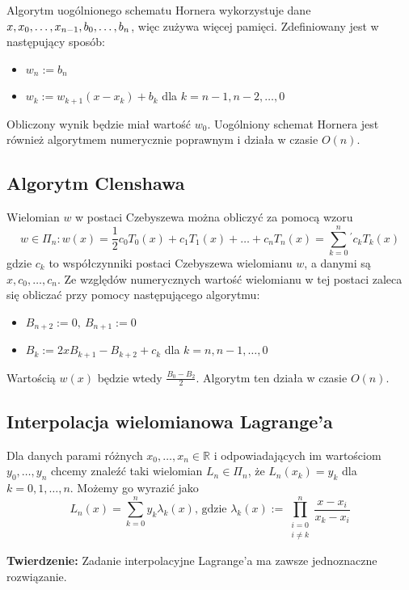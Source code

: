 \documentclass[a4paper,11pt]{article}
\begin{document}
\noindent Algorytm uogólnionego schematu Hornera wykorzystuje dane $x, x_0, \ldots, x_{n-1},\\ b_0, \ldots, b_n$, więc zużywa więcej pamięci. Zdefiniowany jest w następujący sposób:
\begin{itemize}
\item $w_n := b_n$
\item $w_k := w_{k+1}(x-x_k)+b_k$ dla $k=n-1, n-2, \ldots, 0$
\end{itemize}
Obliczony wynik będzie miał wartość $w_0$.
\newline Uogólniony schemat Hornera jest również algorytmem numerycznie poprawnym i działa w czasie $O(n)$.

\subsection{Algorytm Clenshawa}
Wielomian $w$ w postaci Czebyszewa można obliczyć za pomocą wzoru 
$$w\in\Pi_n : w(x)=\frac{1}{2}c_0T_0(x)+c_1T_1(x)+\ldots+c_nT_n(x)=\sum\limits_{k=0}^{n}{}^{'} c_kT_k(x)$$
gdzie $c_k$ to współczynniki postaci Czebyszewa wielomianu $w$, a danymi są $x,  c_0, \ldots, c_n$. Ze względów numerycznych wartość wielomianu w tej postaci zaleca się obliczać przy pomocy następującego algorytmu:
\begin{itemize}
\item $B_{n+2} := 0, \ B_{n+1} := 0$
\item $B_k := 2xB_{k+1} - B_{k+2}+c_k$ dla $k=n, n-1, \ldots, 0$
\end{itemize}
Wartością $w(x)$ będzie wtedy $\frac{B_0-B_2}{2}$. Algorytm ten działa w czasie $O(n)$.

\subsection{Interpolacja wielomianowa Lagrange'a}
Dla danych parami różnych $x_0, \ldots, x_n \in\mathbb{R}$ i odpowiadających im wartościom $y_0, \ldots, y_n$ chcemy znaleźć taki wielomian $L_n \in \Pi_n$, że $L_n(x_k)=y_k$ dla $k=0,1,\ldots,n$. Możemy go wyrazić jako
$$ L_n(x) = \sum\limits_{k=0}^{n}y_k\lambda_k(x) \text{, gdzie } \lambda_k(x):=\prod\limits_{\substack{i=0\\ i\neq k}}^{n} \frac{x-x_i}{x_k-x_i}$$

\noindent \textbf{Twierdzenie:} Zadanie interpolacyjne Lagrange'a ma zawsze jednoznaczne rozwiązanie.
\end{document}
